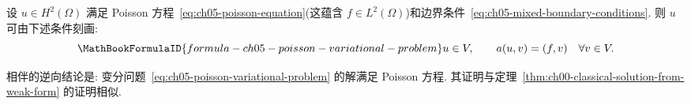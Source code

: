 \begin{Proposition}
\label{prop:ch05-classical-implies-variational}
设 $u\in H^2(\Omega)$ 满足 Poisson 方程~\eqref{eq:ch05-poisson-equation}(这蕴含 $f\in L^2(\Omega)$)和边界条件~\eqref{eq:ch05-mixed-boundary-conditions}. 则 $u$ 可由下述条件刻画:
\begin{equation}
\MathBookFormulaID{formula-ch05-poisson-variational-problem}
\label{eq:ch05-poisson-variational-problem}
u\in V,\qquad a(u,v)=(f,v)\quad\forall v\in V.
\end{equation}
\end{Proposition}

相伴的逆向结论是: 变分问题~\eqref{eq:ch05-poisson-variational-problem} 的解满足 Poisson 方程. 其证明与定理~\ref{thm:ch00-classical-solution-from-weak-form} 的证明相似.

